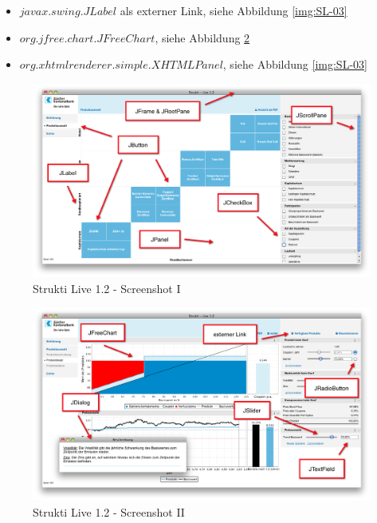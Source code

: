   \begin{itemize}
    \item \(javax.swing.JLabel\) als externer Link, siehe Abbildung
    \ref{img:SL-03}
    \item \(org.jfree.chart.JFreeChart\), siehe Abbildung \ref{img:SL-02}
    \item \(org.xhtmlrenderer.simple.XHTMLPanel\), siehe Abbildung
    \ref{img:SL-03}
  \end{itemize}
  
  \begin{figure}[htb]
    \begin{center}
      \includegraphics[width=\textwidth]{./image/SL/SL-01.png}
      \caption{Strukti Live 1.2 - Screenshot I}
      \label{img:SL-01}
    \end{center}
  \end{figure}
  
  \begin{figure}[htb]
    \begin{center}
      \includegraphics[width=\textwidth]{./image/SL/SL-02.png}
      \caption{Strukti Live 1.2 - Screenshot II}
      \label{img:SL-02}
    \end{center}
  \end{figure}
  
